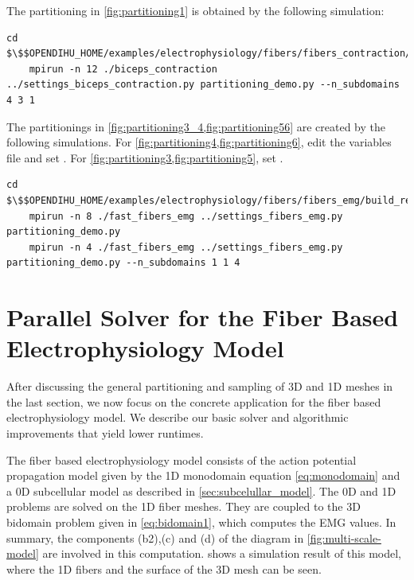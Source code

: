 \begin{reproduce_no_break}
  The partitioning in \cref{fig:partitioning1} is obtained by the following simulation:
  \begin{lstlisting}[columns=fullflexible,breaklines=true,postbreak=\mbox{\textcolor{gray}{$\hookrightarrow$}\space}]
    cd $\$$OPENDIHU_HOME/examples/electrophysiology/fibers/fibers_contraction/no_precice/build_release
    mpirun -n 12 ./biceps_contraction ../settings_biceps_contraction.py partitioning_demo.py --n_subdomains 4 3 1
  \end{lstlisting}
  The partitionings in \cref{fig:partitioning3_4,fig:partitioning56} are created by the following simulations. For \cref{fig:partitioning4,fig:partitioning6}, edit the variables file  and set . For \cref{fig:partitioning3,fig:partitioning5}, set .
  \begin{lstlisting}[columns=fullflexible,breaklines=true,postbreak=\mbox{\textcolor{gray}{$\hookrightarrow$}\space}]
    cd $\$$OPENDIHU_HOME/examples/electrophysiology/fibers/fibers_emg/build_release
    mpirun -n 8 ./fast_fibers_emg ../settings_fibers_emg.py partitioning_demo.py
    mpirun -n 4 ./fast_fibers_emg ../settings_fibers_emg.py partitioning_demo.py --n_subdomains 1 1 4
  \end{lstlisting}
\end{reproduce_no_break}


\section{Parallel Solver for the Fiber Based Electrophysiology Model}\label{sec:parallel_partitioning_for_fiber_based}

After discussing the general partitioning and sampling of 3D and 1D meshes in the last section, we now focus on the concrete application for the fiber based electrophysiology model.
We describe our basic solver and algorithmic improvements that yield lower runtimes.

The fiber based electrophysiology model consists of the action potential propagation model given by the 1D monodomain equation \cref{eq:monodomain} and a 0D subcellular model as described in \cref{sec:subcelullar_model}. The 0D and 1D problems are solved on the 1D fiber meshes. They are coupled to the 3D bidomain problem given in \cref{eq:bidomain1}, which computes the EMG values. In summary, the components (b2),(c) and (d) of the diagram in \cref{fig:multi-scale-model} are involved in this computation.
 shows a simulation result of this model, where the 1D fibers and the surface of the 3D mesh can be seen.

